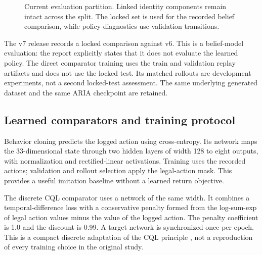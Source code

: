 \documentclass[10pt,a4paper]{article}
\begin{document}
\begin{figure}[htbp]
\centering
{}
\caption{Current evaluation partition. Linked identity components remain intact across the split. The locked set is used for the recorded belief comparison, while policy diagnostics use validation transitions.}
\label{fig:split}
\end{figure}

The v7 release records a locked comparison against v6. This is a belief-model evaluation: the report explicitly states that it does not evaluate the learned policy. The direct comparator training uses the train and validation replay artifacts and does not use the locked test. Its matched rollouts are development experiments, not a second locked-test assessment. The same underlying generated dataset and the same ARIA checkpoint are retained.

\subsection{Learned comparators and training protocol}
Behavior cloning predicts the logged action using cross-entropy. Its network maps the 33-dimensional state through two hidden layers of width 128 to eight outputs, with normalization and rectified-linear activations. Training uses the recorded actions; validation and rollout selection apply the legal-action mask. This provides a useful imitation baseline without a learned return objective.

The discrete CQL comparator uses a network of the same width. It combines a temporal-difference loss with a conservative penalty formed from the log-sum-exp of legal action values minus the value of the logged action. The penalty coefficient is 1.0 and the discount is 0.99. A target network is synchronized once per epoch. This is a compact discrete adaptation of the CQL principle \cite{cql}, not a reproduction of every training choice in the original study.
\end{document}
